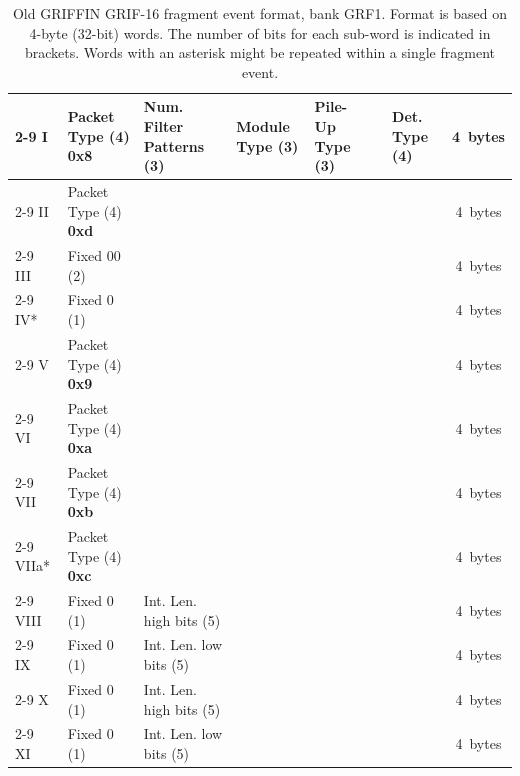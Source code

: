 \documentclass[letterpaper,12pt,notitlepage]{report}
\begin{document}
\begin{landscape}
\begin{table}
\caption{Old GRIFFIN GRIF-16 fragment event format, bank GRF1. Format is based on 4-byte (32-bit) words. The number of bits for each sub-word is indicated in brackets. Words with an asterisk might be repeated within a single fragment event.}
\begin{tabular*}{\textwidth}{p{0.9cm}|p{2.25cm}|p{2.2cm}|p{2.2cm}|p{2.2cm}|p{2.2cm}|p{2.2cm}|p{2.2cm}|p{2.2cm}|c}
\cline{2-9}
I& Packet Type (4) {\bf 0x8} & Num. Filter Patterns (3) & Module Type (3) & Pile-Up Type (3) & \multicolumn{3}{p{6.6cm}|}{\centering{Address (16)}} & Det. Type (4) & 4~bytes\\
\cline{2-9}
II & Packet Type (4) {\bf 0xd} & \multicolumn{7}{p{15.4cm}|}{\centering{Network Packet Counter Value (28)}} & 4~bytes\\
\cline{2-9}
III & Fixed 00 (2) & \multicolumn{3}{p{6.6cm}|}{\centering{Filter Patterns (14)}} & \multicolumn{4}{p{8.8cm}|}{\centering{PPG pattern (10)}} & 4~bytes\\
\cline{2-9}
IV* & Fixed 0 (1) & \multicolumn{7}{p{15.4cm}|}{\centering{Filter Condition Counter Value (31)}} & 4~bytes\\
\cline{2-9}
V & Packet Type (4) {\bf 0x9} & \multicolumn{7}{p{15.4cm}|}{\centering{Channel Hit Detection Counter Value (28)}} & 4~bytes\\
\cline{2-9}
VI & Packet Type (4) {\bf 0xa} & \multicolumn{7}{p{15.4cm}|}{\centering{Time Stamp low bits (28)}} & 4~bytes\\
\cline{2-9}
VII & Packet Type (4) {\bf 0xb} & \multicolumn{3}{p{6.6cm}|}{\centering{Deadtime (14)}} & \multicolumn{4}{p{8.8cm}|}{\centering{Time Stamp high bits (14)}} & 4~bytes\\
\cline{2-9}
VIIa* & Packet Type (4) {\bf 0xc} & \multicolumn{7}{p{15.4cm}|}{\centering{Waveform Sample (28)}} & 4~bytes\\
\cline{2-9}
VIII & Fixed 0 (1) & Int. Len. high bits (5) & \multicolumn{6}{p{13.2cm}|}{\centering{Pulse Height 1 (26)}} & 4~bytes\\
\cline{2-9}
IX & Fixed 0 (1) & Int. Len. low bits (5) & \multicolumn{6}{p{13.2cm}|}{\centering{CFD 1 (26)}} & 4~bytes\\
\cline{2-9}
X & Fixed 0 (1) & Int. Len. high bits (5) & \multicolumn{6}{p{13.2cm}|}{\centering{Pulse Height 2 (26)}} & 4~bytes\\
\cline{2-9}
XI & Fixed 0 (1) & Int. Len. low bits (5) & \multicolumn{6}{p{13.2cm}|}{\centering{CFD 2 (26)}} & 4~bytes\\

\end{tabular*}
\end{table}
\end{landscape}
\end{document}
